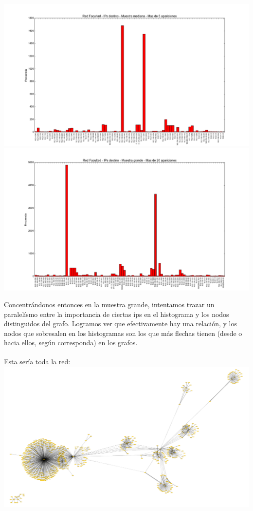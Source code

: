 \includegraphics[scale=0.5,clip=true,trim=140 0 0 0]{graphics/facumediana_dst.png}
\includegraphics[scale=0.5,clip=true,trim=140 0 0 0]{graphics/facultad_dst.png}

\indent Concentrándonos entonces en la muestra grande, intentamos trazar un paralelísmo entre la importancia de ciertas ips en el histograma y los nodos distinguidos del grafo. Logramos ver que efectivamente hay una relación, y los nodos que sobresalen en los histogramas son los que más flechas tienen (desde o hacia ellos, según corresponda) en los grafos.\\
\\
\indent Esta sería toda la red:\\
\includegraphics[scale=0.5,clip=true,trim=140 0 0 0]{graphics/toda_la_red.png}

